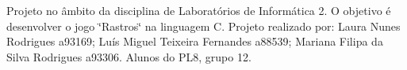 Projeto no âmbito da disciplina de Laboratórios de Informática 2. O objetivo é desenvolver o jogo \char`\"{}\+Rastros\char`\"{} na linguagem C. Projeto realizado por\+: Laura Nunes Rodrigues a93169; Luís Miguel Teixeira Fernandes a88539; Mariana Filipa da Silva Rodrigues a93306. Alunos do P\+L8, grupo 12. 